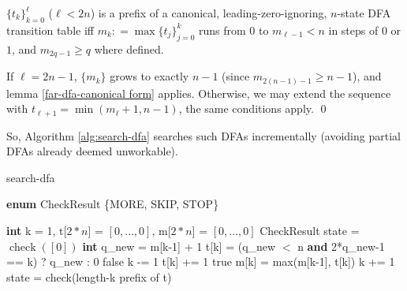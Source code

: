 \begin{corollary}
  $\{t_k\}_{k=0}^\ell$ ($\ell<2n$) is a prefix of a canonical, leading-zero-ignoring, $n$-state DFA transition table iff
  $m_k \mathrel{\mathop:}= \max\{t_j\}_{j=0}^k$ runs from $0$ to $m_{\ell-1}<n$ in steps of $0$ or $1$, and $m_{2q-1}\ge q$ where defined.
\end{corollary}
\proof
If $\ell=2n-1$, $\{m_k\}$ grows to exactly $n-1$ (since $m_{2(n-1)-1}\ge n-1$), and lemma \ref{far-dfa-canonical form} applies.
Otherwise, we may extend the sequence with $t_{\ell+1}=\min(m_\ell+1,n-1)$, the same conditions apply.
\qed

So, Algorithm \ref{alg:search-dfa} searches such DFAs incrementally (avoiding partial DFAs already deemed unworkable).

\begin{algorithm}
  \caption{{\sc search-dfa}}\label{alg:search-dfa}

  \begin{algorithmic}[1]
    \State \textbf{enum} CheckResult \{MORE, SKIP, STOP\}
    \Statex

      \State \textbf{int} k = 1, t[$2*n$] = $[0,\ldots,0]$, m[$2*n$] = $[0,\ldots,0]$
      \State CheckResult state = $\operatorname{check}([0])$
      \Loop
          \State \textbf{int} q\_new = m[k-1] + 1
          \State t[k] = (q\_new $<$ \textrm{n} \textbf{and} 2*q\_new-1 == k) ? q\_new : 0
          \Repeat
            \Return false
          \EndIf
          \State k -= 1
          \State t[k] += 1
        \Else\;\Return true
        \EndIf
        \State m[k] = max(m[k-1], t[k])
        \State k += 1
        \State state = check(length-k prefix of t)
      \EndLoop
    \EndProcedure

  \end{algorithmic}
\end{algorithm}


